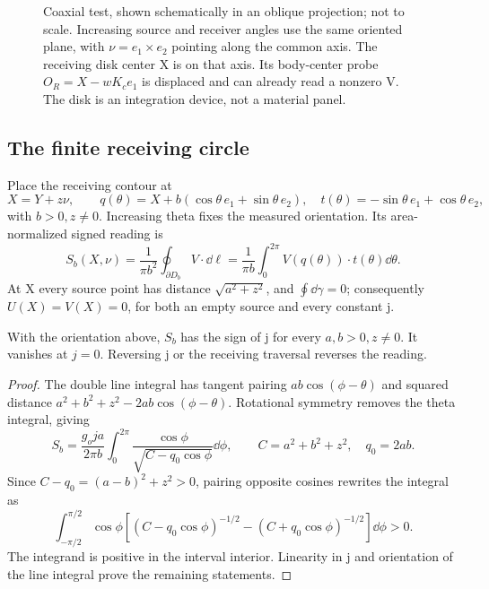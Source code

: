 \begin{figure}[tbp]
\centering
\caption{Coaxial test, shown schematically in an oblique projection; not to scale. Increasing source and receiver angles use the same oriented plane, with \(\nu=e_1\times e_2\) pointing along the common axis. The receiving disk center X is on that axis. Its body-center probe \(O_R=X-wK_ce_1\) is displaced and can already read a nonzero V. The disk is an integration device, not a material panel.}\label{fig:coaxial}
\end{figure}

\subsection{The finite receiving circle}
Place the receiving contour at
\begin{equation}\label{eq:coaxreceiver}
X=Y+z\nu,\qquad q(\theta)=X+b(\cos\theta\,e_1+\sin\theta\,e_2),
\quad t(\theta)=-\sin\theta\,e_1+\cos\theta\,e_2,
\end{equation}
with \(b>0,z\ne0\). Increasing theta fixes the measured orientation. Its area-normalized signed reading is
\begin{equation}\label{eq:sensor}
S_b(X,\nu)=\frac1{\pi b^2}\oint_{\partial D_b}V\cdot\dd\ell
=\frac1{\pi b}\int_0^{2\pi}V(q(\theta))\cdot t(\theta)\dd\theta.
\end{equation}
At X every source point has distance \(\sqrt{a^2+z^2}\), and \(\oint\dd\gamma=0\); consequently \(U(X)=V(X)=0\), for both an empty source and every constant j.

\begin{theorem}\label{thm:coaxial}
With the orientation above, \(S_b\) has the sign of j for every \(a,b>0,z\ne0\). It vanishes at \(j=0\). Reversing j or the receiving traversal reverses the reading.
\end{theorem}
\begin{proof}
The double line integral has tangent pairing \(ab\cos(\phi-\theta)\) and squared distance
\(a^2+b^2+z^2-2ab\cos(\phi-\theta)\). Rotational symmetry removes the theta integral, giving
\begin{equation}\label{eq:coaxexact}
S_b=\frac{g_oj a}{2\pi b}\int_0^{2\pi}
\frac{\cos\phi}{\sqrt{C-q_0\cos\phi}}\dd\phi,\qquad
C=a^2+b^2+z^2,\quad q_0=2ab.
\end{equation}
Since \(C-q_0=(a-b)^2+z^2>0\), pairing opposite cosines rewrites the integral as
\begin{equation}\label{eq:positivepair}
\int_{-\pi/2}^{\pi/2}\cos\phi
\left[(C-q_0\cos\phi)^{-1/2}-(C+q_0\cos\phi)^{-1/2}\right]\dd\phi>0.
\end{equation}
The integrand is positive in the interval interior. Linearity in j and orientation of the line integral prove the remaining statements.
\end{proof}

